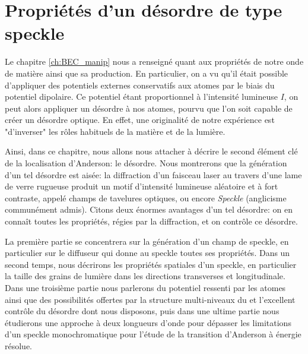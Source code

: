 \chapter{Propriétés d'un désordre de type speckle}
\label{ch:Speckle}

Le chapitre \ref{ch:BEC_manip} nous a renseigné quant aux propriétés de notre onde de matière ainsi que sa production. En particulier, on a vu qu'il était possible d'appliquer des potentiels externes conservatifs aux atomes par le biais du potentiel dipolaire. Ce potentiel étant proportionnel à l'intensité lumineuse $I$, on peut alors appliquer un désordre à nos atomes, pourvu que l'on soit capable de créer un désordre optique. En effet, une originalité de notre expérience est "d'inverser" les rôles habituels de la matière et de la lumière.

Ainsi, dans ce chapitre, nous allons nous attacher à décrire le second élément clé de la localisation d'Anderson: le désordre. Nous montrerons que la génération d'un tel désordre est aisée: la diffraction d'un faisceau laser au travers d'une lame de verre rugueuse produit un motif d'intensité lumineuse aléatoire et à fort contraste, appelé champs de tavelures optiques, ou encore \emph{Speckle} (anglicisme communément admis). Citons deux énormes avantages d'un tel désordre: on en connaît toutes les propriétés, régies par la diffraction, et on contrôle ce désordre. 

La première partie se concentrera sur la génération d'un champ de speckle, en particulier sur le diffuseur qui donne au speckle toutes ses propriétés. Dans un second temps, nous décrirons les propriétés spatiales d'un speckle, en particulier la taille des grains de lumière dans les directions transverses et longitudinale. Dans une troisième partie nous parlerons du potentiel ressenti par les atomes ainsi que des possibilités offertes par la structure multi-niveaux du  et l'excellent contrôle du désordre dont nous disposons, puis dans une ultime partie nous étudierons une approche à deux longueurs d'onde pour dépasser les limitations d'un speckle monochromatique pour l'étude de la transition d'Anderson à énergie résolue. 

